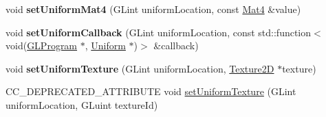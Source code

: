 \begin{DoxyCompactItemize}
\item 
\mbox{\label{classGLProgramState_a88c2777ee39a1e1f5e7c66dd4bd0ac80}} 
void {\bfseries set\+Uniform\+Mat4} (G\+Lint uniform\+Location, const \hyperlink{classMat4}{Mat4} \&value)
\item 
\mbox{\label{classGLProgramState_a80ea832a228428b50f96a2780a7ce82d}} 
void {\bfseries set\+Uniform\+Callback} (G\+Lint uniform\+Location, const std\+::function$<$ void(\hyperlink{classGLProgram}{G\+L\+Program} $\ast$, \hyperlink{structUniform}{Uniform} $\ast$)$>$ \&callback)
\item 
\mbox{\label{classGLProgramState_a0714ac1d8d04e5da63082a4a51e3fc43}} 
void {\bfseries set\+Uniform\+Texture} (G\+Lint uniform\+Location, \hyperlink{classTexture2D}{Texture2D} $\ast$texture)
\item 
C\+C\+\_\+\+D\+E\+P\+R\+E\+C\+A\+T\+E\+D\+\_\+\+A\+T\+T\+R\+I\+B\+U\+TE void \hyperlink{classGLProgramState_a642a29610687e43ce7f9c7af0cfa0495}{set\+Uniform\+Texture} (G\+Lint uniform\+Location, G\+Luint texture\+Id)
\end{DoxyCompactItemize}

